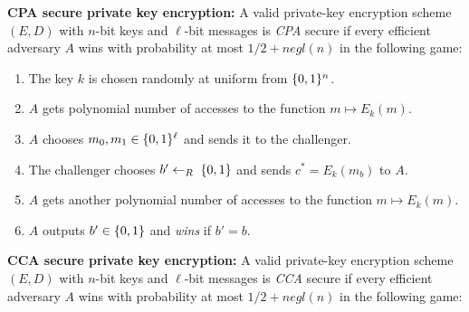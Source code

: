 \documentclass{article}
\begin{document}
\textbf{CPA secure private key encryption:} A valid private-key encryption scheme $(E,D)$ with $n$-bit keys and $\ell$-bit messages
is \emph{CPA} secure if  every efficient adversary $A$ wins with probability at most $1/2+negl(n)$ in the following game:%

\begin{enumerate}[noitemsep,topsep=\mdcompacttopsep]%

\item{}The key $k$ is chosen randomly at uniform from $\{0,1\}^n$.%

\item{}$A$ gets polynomial number of accesses to the function $m \mapsto E_k(m)$.%

\item{}$A$ chooses $m_0,m_1 \in \{0,1\}^\ell$ and sends it to the challenger.%

\item{}The challenger chooses $b'\leftarrow_R\;\{0,1\}$ and sends $c^* = E_k(m_b)$ to $A$.%

\item{}$A$ gets another polynomial number of accesses to the function $m \mapsto E_k(m)$.%

\item{}$A$ outputs $b'\in\{0,1\}$ and \emph{wins} if $b'=b$.%
\end{enumerate}%

\noindent{}\textbf{CCA secure private key encryption:} A valid  private-key encryption scheme $(E,D)$ with $n$-bit keys and $\ell$-bit messages
is \emph{CCA} secure if  every efficient adversary $A$ wins with probability at most $1/2+negl(n)$ in the following game:%
\end{document}
